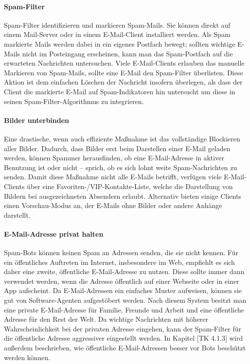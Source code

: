 \paragraph{Spam-Filter}
\label{par:spam-filter}

Spam-Filter identifizieren und markieren Spam-Mails. Sie können direkt
auf einem Mail-Server oder in einem E-Mail-Client installiert werden.
Als Spam markierte Mails werden dabei in ein eigenes Postfach bewegt;
sollten wichtige E-Mails nicht im Posteingang erscheinen, kann man das
Spam-Postfach auf die erwarteten Nachrichten untersuchen. Viele
E-Mail-Clients erlauben das manuelle Markieren von Spam-Mails, sollte
eine E-Mail den Spam-Filter überlisten. Diese Aktion ist dem einfachen
Löschen der Nachricht insofern überlegen, als dass der Client die
markierte E-Mail auf Spam-Indikatoren hin untersucht um diese in seinen
Spam-Filter-Algorithmus zu integrieren.

\paragraph{Bilder unterbinden}
\label{par:bilder-unterbinden}

Eine drastische, wenn auch effiziente Maßnahme ist das vollständige
Blockieren aller Bilder. Dadurch, dass Bilder erst beim Darstellen einer
E-Mail geladen werden, können Spammer herausfinden, ob eine
E-Mail-Adresse in aktiver Benutzung ist oder nicht -- sprich, ob es sich
lohnt weite Spam-Nachrichten zu senden. Damit diese Maßnahme nicht alle
E-Mails betrifft, verfügen viele E-Mail-Clients über eine
Favoriten-/VIP-Kontakte-Liste, welche die Darstellung von Bildern bei
ausgezeichneten Absendern erlaubt. Alternativ bieten einige Clients
einen Vorschau-Modus an, der E-Mails ohne Bilder oder andere Anhänge
darstellt.

\paragraph{E-Mail-Adresse privat halten}
\label{par:e-mail-adresse-privat-halten}

Spam-Bots können keinen Spam an Adressen senden, die sie nicht kennen.
Für ein öffentliches Auftreten im Internet, insbesondere im Web,
empfiehlt es sich daher eine zweite, öffentliche E-Mail-Adresse zu
nutzen. Diese sollte immer dann verwendet werden, wenn die Adresse
öffentlich auf einer Webseite oder in einer App aufscheint. Da
E-Mail-Adressen ein einfaches Muster aufweisen, können sie gut von
Software-Agenten aufgestöbert werden. Nach diesem System besitzt man
eine private E-Mail-Adresse für Familie, Freunde und Arbeit und eine
öffentliche Adresse für den Rest der Welt. Da wichtige Nachrichten mit
höherer Wahrscheinlichkeit bei der privaten Adresse eingehen, kann der
Spam-Filter für die öffentliche Adresse aggressiver eingestellt werden.
In Kapitel {[}TK 4.1.3{]} wird außerdem beschrieben, wie öffentliche
E-Mail-Adressen besser vor Bots beschützt werden können.


